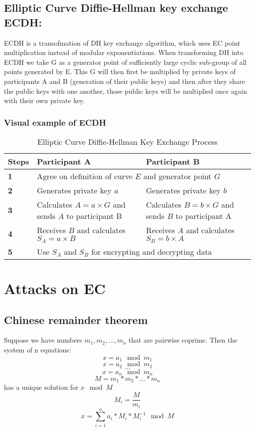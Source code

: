 \documentclass[bp,en]{FEIstyle}
\begin{document}
\subsection*{Elliptic Curve Diffie-Hellman key exchange ECDH:}
ECDH is a transofmation of DH key exchange algorithm, which uses EC point multiplication instead of modular exponentiations. When transforming DH into ECDH we take G as a generator point of sufficiently large cyclic sub-group of all points generated by E. This G will then first be multiplied by private keys of participants A and B (generation of their public keys) and then after they share the public keys with one another, those public keys will be multiplied once again with their own private key.
\subsubsection*{Visual example of ECDH}
\begin{table}[h!]
\centering
\small %
\begin{tabular}{|p{1cm}|p{5cm}|p{5cm}|} %
\hline
\textbf{Steps} & \textbf{Participant A} & \textbf{Participant B} \\ \hline
\textbf{1} & \multicolumn{2}{p{10cm}|}{Agree on definition of curve \(E\) and generator point \( G\)} \\ \hline
\textbf{2} & Generates private key \( a \) & Generates private key \( b \)  \\ \hline
\textbf{3} & Calculates \( A = a\times G \) and sends \( A \) to participant B & Calculates \( B = b\times G \) and sends \( B \) to participant A \\ \hline
\textbf{4} & Receives \( B \)  and calculates \( S_A = a\times B  \) & Receives \( A \)  and calculates \( S_B = b\times A  \) \\ \hline
\textbf{5} & \multicolumn{2}{p{10cm}|}{Use \(S_A\) and \(S_B\) for encrypting and decrypting data } \\ \hline
\end{tabular}
\caption{Elliptic Curve Diffie-Hellman Key Exchange Process}
\label{tab:diffie_hellman}
\end{table}

\newpage


\section*{Attacks on EC}

\subsection*{Chinese remainder theorem}
Suppose we have numbers $m_1,m_2,...,m_n$ that are pairwise coprime. Then the system of n equations: 
\[
x = a_1 \mod m_1
\]
\[
x = a_2 \mod m_2
\]
\[
...
\]
\[
x = a_n \mod m_n
\]
\[
M=m_1*m_2*...*m_n 
\]
has a unique solution for $x \mod M$ 
\[
M_i = \frac{M}{m_i}
\]
\[
x = \sum_{i=1}^{n} a_i*M_i*M_i^{-1}\mod M
\]
\end{document}
